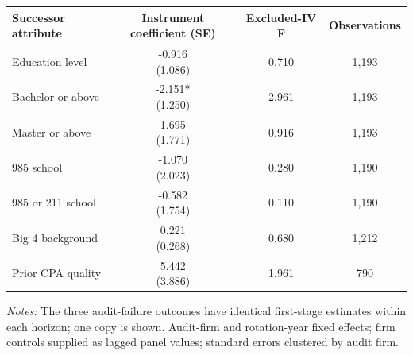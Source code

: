 \documentclass[10pt]{article}
\begin{document}
\begin{minipage}{19cm}\fontsize{10}{12}\selectfont\setlength{\tabcolsep}{4pt}\renewcommand{\arraystretch}{1.12}


\centering
{}
\begin{threeparttable}
\begin{tabular}{p{}ccc}
\toprule
Successor attribute & Instrument coefficient (SE) & Excluded-IV F & Observations \\
\midrule
Education level & \shortstack{-0.916\\(1.086)} & 0.710 & 1,193 \\
Bachelor or above & \shortstack{-2.151*\\(1.250)} & 2.961 & 1,193 \\
Master or above & \shortstack{1.695\\(1.771)} & 0.916 & 1,193 \\
985 school & \shortstack{-1.070\\(2.023)} & 0.280 & 1,190 \\
985 or 211 school & \shortstack{-0.582\\(1.754)} & 0.110 & 1,190 \\
Big 4 background & \shortstack{0.221\\(0.268)} & 0.680 & 1,212 \\
Prior CPA quality & \shortstack{5.442\\(3.886)} & 1.961 & 790 \\
\bottomrule
\end{tabular}
\begin{tablenotes}\fontsize{9}{11}\selectfont
\item \raggedright \fontsize{9}{11}\selectfont \textit{Notes:} The three audit-failure outcomes have identical first-stage estimates within each horizon; one copy is shown. Audit-firm and rotation-year fixed effects; firm controls supplied as lagged panel values; standard errors clustered by audit firm.
\end{tablenotes}
\end{threeparttable}

\end{minipage}
\end{document}
